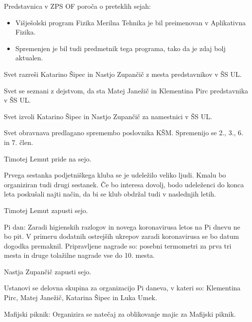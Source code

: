 \documentclass{seja}
\begin{document}
\begin{ad}
    Predstavnica v ZPS OF poroča o preteklih sejah:
    \begin{itemize}
        \item Višješolski program Fizika Merilna Tehnika je bil preimenovan v Aplikativna Fizika. 
        \item Spremenjen je bil tudi predmetnik tega programa, tako da je zdaj bolj aktualen.
    \end{itemize}
    
    \item
    \begin{sklep*}
    Svet razreši Katarino Šipec in Nastjo Zupančič z mesta predstavnikov v ŠS UL.
    \end{sklep*}
    
    Svet se seznani z dejstvom, da sta Matej Janežič in Klementina Pirc predstavnika v ŠS UL.
    \begin{sklep*}
    Svet izvoli Katarino Šipec in Nastjo Zupančič za namestnici v ŠS UL.
    \end{sklep*}
    
    \item Svet obravnava predlagano spremembo poslovnika KŠM. Spremenijo se 2., 3., 6. in 7. člen. 
    
    Timotej Lemut pride na sejo.
    
    \item
    Prvega sestanka podjetniškega kluba se je udeležilo veliko ljudi. Kmalu bo organiziran tudi drugi sestanek. Če bo interesa dovolj, bodo udeleženci do konca leta poskušali najti način, da bi se klub obdržal tudi v naslednjih letih.
    
    Timotej Lemut zapusti sejo.
    
    \item Pi dan: 
    Zaradi higienskih razlogov in novega koronavirusa letos na Pi dnevu ne bo pit. V primeru dodatnih ostrejših ukrepov zaradi koronavirusa se bo datum dogodka premaknil. Pripravljene nagrade so: posebni termometri za prva tri mesta in druge tolažilne nagrade vse do 10. mesta.
    
    Nastja Zupančič zapusti sejo.
    
    \begin{sklep*}
    Ustanovi se delovna skupina za organizacijo Pi daneva, v kateri so: Klementina Pirc, Matej Janežič, Katarina Šipec in Luka Umek.
    \end{sklep*}
    
    \item Mafijski piknik: 
    Organizira se natečaj za oblikovanje majic za Mafijski piknik. 
    
\end{ad}
\end{document}
